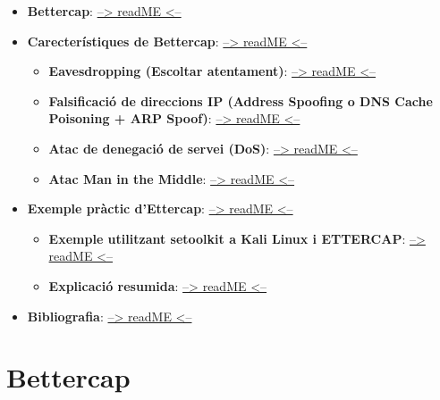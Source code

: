 \documentclass[]{article}
\begin{document}
\begin{itemize}
\item
  \textbf{Bettercap}: \protect\hyperlink{bettercap}{--\textgreater{}
  readME \textless{}--}
\item
  \textbf{Carecterístiques de Bettercap}:
  \protect\hyperlink{carecteruxedstiques-de-bettercap}{--\textgreater{}
  readME \textless{}--}

  \begin{itemize}
  \item
    \textbf{Eavesdropping (Escoltar atentament)}:
    \protect\hyperlink{eavesdropping-escoltar-atentament}{--\textgreater{}
    readME \textless{}--}
  \item
    \textbf{Falsificació de direccions IP (Address Spoofing o DNS Cache
    Poisoning + ARP Spoof)}:
    \protect\hyperlink{falsificaciuxf3-de-direccions-ip-address-spoofing-o-dns-cache-poisoning--arp-spoof}{--\textgreater{}
    readME \textless{}--}
  \item
    \textbf{Atac de denegació de servei (DoS)}:
    \protect\hyperlink{atac-de-denegaciuxf3-de-servei-dos}{--\textgreater{}
    readME \textless{}--}
  \item
    \textbf{Atac Man in the Middle}:
    \protect\hyperlink{atac-man-in-the-middle}{--\textgreater{} readME
    \textless{}--}
  \end{itemize}
\item
  \textbf{Exemple pràctic d'Ettercap}:
  \protect\hyperlink{exemple-pruxe0ctic-dettercap}{--\textgreater{}
  readME \textless{}--}

  \begin{itemize}
  \item
    \textbf{Exemple utilitzant \textbf{setoolkit} a Kali Linux i
    ETTERCAP}:
    \protect\hyperlink{exemple-1-utilitzant-setoolkit-a-kali-linux-i-ettercap}{--\textgreater{}
    readME \textless{}--}
  \item
    \textbf{Explicació resumida}:
    \protect\hyperlink{explicaciuxf3-resumida}{--\textgreater{} readME
    \textless{}--}
  \end{itemize}
\item
  \textbf{Bibliografia}:
  \protect\hyperlink{bibliografia}{--\textgreater{} readME
  \textless{}--}
\end{itemize}

\hypertarget{bettercap}{%
\section{\texorpdfstring{\textbf{Bettercap}}{Bettercap}}\label{bettercap}}
\end{document}

